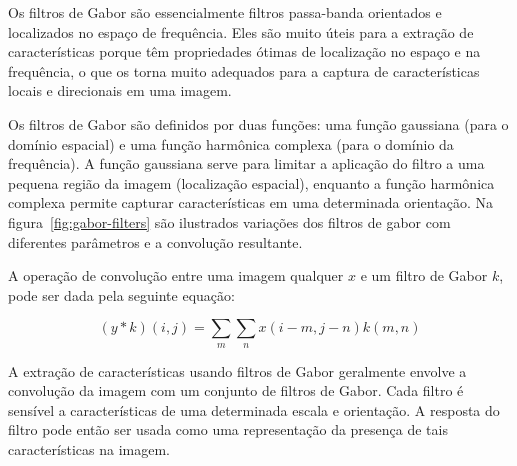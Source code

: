 Os filtros de Gabor são essencialmente filtros passa-banda orientados
e localizados no espaço de frequência. Eles são muito úteis para a
extração de características porque têm propriedades ótimas de
localização no espaço e na frequência, o que os torna muito adequados
para a captura de características locais e direcionais em uma imagem.

Os filtros de Gabor são definidos por duas funções: uma função
gaussiana (para o domínio espacial) e uma função harmônica complexa
(para o domínio da frequência). A função gaussiana serve para limitar
a aplicação do filtro a uma pequena região da imagem (localização
espacial), enquanto a função harmônica complexa permite capturar
características em uma determinada orientação. Na
figura~\ref{fig:gabor-filters} são ilustrados variações dos
filtros de gabor com diferentes parâmetros e a convolução resultante.

\begin{figure}[!h]
        \captionsetup{width=12cm}
		\centering
\end{figure}
\FloatBarrier{}

A operação de convolução entre uma imagem qualquer $ x $ e um filtro de
Gabor $ k $, pode ser dada pela seguinte equação:

\begin{equation}
  (y * k)(i, j) = \sum_{m} \sum_{n} x(i-m, j-n) k(m, n)
\end{equation}

A extração de características usando filtros de Gabor geralmente
envolve a convolução da imagem com um conjunto de filtros de
Gabor. Cada filtro é sensível a características de uma determinada
escala e orientação. A resposta do filtro pode então ser usada como
uma representação da presença de tais características na imagem.

